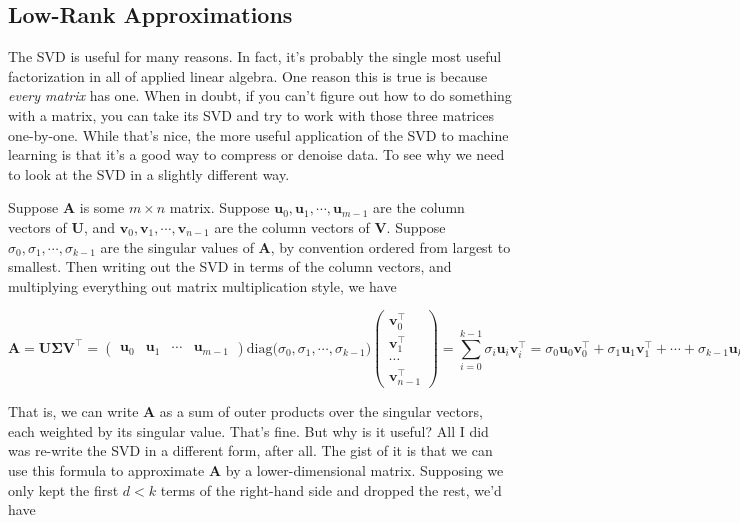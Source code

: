 \documentclass[
  letterpaper,
  DIV=11,
  numbers=noendperiod]{scrreprt}
\begin{document}
\hypertarget{low-rank-approximations}{%
\subsection{Low-Rank Approximations}\label{low-rank-approximations}}

The SVD is useful for many reasons. In fact, it's probably the single
most useful factorization in all of applied linear algebra. One reason
this is true is because \emph{every matrix} has one. When in doubt, if
you can't figure out how to do something with a matrix, you can take its
SVD and try to work with those three matrices one-by-one. While that's
nice, the more useful application of the SVD to machine learning is that
it's a good way to compress or denoise data. To see why we need to look
at the SVD in a slightly different way.

Suppose \(\mathbf{A}\) is some \(m \times n\) matrix. Suppose
\(\mathbf{u}_0, \mathbf{u}_1, \cdots, \mathbf{u}_{m-1}\) are the column
vectors of \(\mathbf{U}\), and
\(\mathbf{v}_0, \mathbf{v}_1, \cdots, \mathbf{v}_{n-1}\) are the column
vectors of \(\mathbf{V}\). Suppose
\(\sigma_0, \sigma_1, \cdots, \sigma_{k-1}\) are the singular values of
\(\mathbf{A}\), by convention ordered from largest to smallest. Then
writing out the SVD in terms of the column vectors, and multiplying
everything out matrix multiplication style, we have

\[
\mathbf{A} = \mathbf{U} \mathbf{\Sigma} \mathbf{V}^\top = 
\begin{pmatrix}
\mathbf{u}_0 & \mathbf{u}_1 & \cdots & \mathbf{u}_{m-1}
\end{pmatrix}
\text{diag}\big(\sigma_0, \sigma_1, \cdots, \sigma_{k-1}\big)
\begin{pmatrix}
\mathbf{v}_0^\top \\ \mathbf{v}_1^\top \\ \cdots \\ \mathbf{v}_{n-1}^\top
\end{pmatrix} = 
\sum_{i=0}^{k-1} \sigma_i \mathbf{u}_i \mathbf{v}_i^\top = 
\sigma_0 \mathbf{u}_0 \mathbf{v}_0^\top + \sigma_1 \mathbf{u}_1 \mathbf{v}_1^\top + \cdots + \sigma_{k-1} \mathbf{u}_{k-1} \mathbf{v}_{k-1}^\top.
\]

That is, we can write \(\mathbf{A}\) as a sum of outer products over the
singular vectors, each weighted by its singular value. That's fine. But
why is it useful? All I did was re-write the SVD in a different form,
after all. The gist of it is that we can use this formula to approximate
\(\mathbf{A}\) by a lower-dimensional matrix. Supposing we only kept the
first \(d < k\) terms of the right-hand side and dropped the rest, we'd
have
\end{document}
